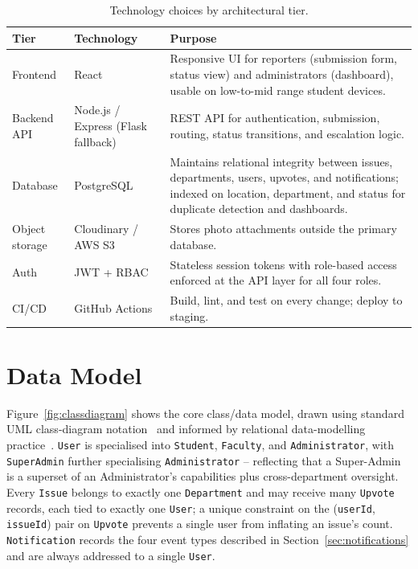 \documentclass[11pt]{report}
\begin{document}
\begin{table}[H]
\centering
\begin{tabular}{|p{2.6cm}|p{3.6cm}|p{8cm}|}
\hline
\textbf{Tier} & \textbf{Technology} & \textbf{Purpose} \\
\hline
Frontend & React & Responsive UI for reporters (submission form, status view) and administrators (dashboard), usable on low-to-mid range student devices. \\
\hline
Backend API & Node.js / Express (Flask fallback) & REST API for authentication, submission, routing, status transitions, and escalation logic. \\
\hline
Database & PostgreSQL & Maintains relational integrity between issues, departments, users, upvotes, and notifications; indexed on location, department, and status for duplicate detection and dashboards. \\
\hline
Object storage & Cloudinary / AWS S3 & Stores photo attachments outside the primary database. \\
\hline
Auth & JWT + RBAC & Stateless session tokens with role-based access enforced at the API layer for all four roles. \\
\hline
CI/CD & GitHub Actions & Build, lint, and test on every change; deploy to staging. \\
\hline
\end{tabular}
\caption{Technology choices by architectural tier.}
\label{tab:web-architecture}
\end{table}

\section{Data Model}

Figure~\ref{fig:classdiagram} shows the core class/data model, drawn
using standard UML class-diagram notation~\cite{fowler2004uml} and
informed by relational data-modelling practice~\cite{elmasri2015}.
\texttt{User}
is specialised into \texttt{Student}, \texttt{Faculty}, and
\texttt{Administrator}, with \texttt{SuperAdmin} further specialising
\texttt{Administrator} -- reflecting that a Super-Admin is a superset of
an Administrator's capabilities plus cross-department oversight. Every
\texttt{Issue} belongs to exactly one \texttt{Department} and may
receive many \texttt{Upvote} records, each tied to exactly one
\texttt{User}; a unique constraint on the (\texttt{userId},
\texttt{issueId}) pair on \texttt{Upvote} prevents a single user from
inflating an issue's count. \texttt{Notification} records the four
event types described in Section~\ref{sec:notifications} and are always
addressed to a single \texttt{User}.
\end{document}

